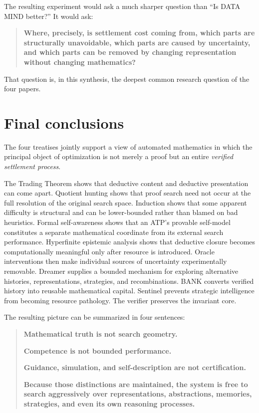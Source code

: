 \documentclass[11pt]{article}
\begin{document}
The resulting experiment would ask a much sharper question than ``Is DATA MIND better?'' It would ask:

\begin{quote}
\textbf{Where, precisely, is settlement cost coming from, which parts are structurally unavoidable, which parts are caused by uncertainty, and which parts can be removed by changing representation without changing mathematics?}
\end{quote}

That question is, in this synthesis, the deepest common research question of the four papers.

\section{Final conclusions}

The four treatises jointly support a view of automated mathematics in which the principal object of optimization is not merely a proof but an entire \emph{verified settlement process}.

The Trading Theorem shows that deductive content and deductive presentation can come apart. Quotient hunting shows that proof search need not occur at the full resolution of the original search space. Induction shows that some apparent difficulty is structural and can be lower-bounded rather than blamed on bad heuristics. Formal self-awareness shows that an ATP's provable self-model constitutes a separate mathematical coordinate from its external search performance. Hyperfinite epistemic analysis shows that deductive closure becomes computationally meaningful only after resource is introduced. Oracle interventions then make individual sources of uncertainty experimentally removable. Dreamer supplies a bounded mechanism for exploring alternative histories, representations, strategies, and recombinations. BANK converts verified history into reusable mathematical capital. Sentinel prevents strategic intelligence from becoming resource pathology. The verifier preserves the invariant core.

The resulting picture can be summarized in four sentences:

\begin{quote}
\textbf{Mathematical truth is not search geometry.}

\textbf{Competence is not bounded performance.}

\textbf{Guidance, simulation, and self-description are not certification.}

\textbf{Because those distinctions are maintained, the system is free to search aggressively over representations, abstractions, memories, strategies, and even its own reasoning processes.}
\end{quote}
\end{document}
